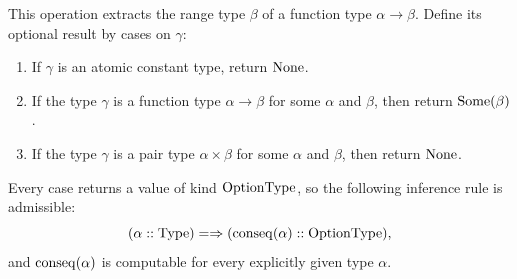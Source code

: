 \begin{definition}[$\conseq :: (\Type \cimplies \OptionType)$]
This operation extracts the range type $\beta$ of a function type
$\alpha\to\beta$. Define its optional result by cases on $\gamma$:
\begin{enumerate}
\item If $\gamma$ is an atomic constant type, return $\mathrm{None}$.
\item If the type $\gamma$ is a function type $\alpha\to\beta$ for some $\alpha$ and $\beta$, then return $\mathrm{Some}(\beta)$.
\item If the type $\gamma$ is a pair type $\alpha\times\beta$ for some $\alpha$ and $\beta$, then return $\mathrm{None}$.
\end{enumerate}
Every case returns a value of kind $\mathrm{OptionType}$, so the following
inference rule is admissible:
\[
(\alpha::\mathrm{Type}) =\Rightarrow (\mathrm{conseq}(\alpha)::\mathrm{OptionType}),
\]
and $\mathrm{conseq}(\alpha)$ is computable for every explicitly given type $\alpha$.
\end{definition}
